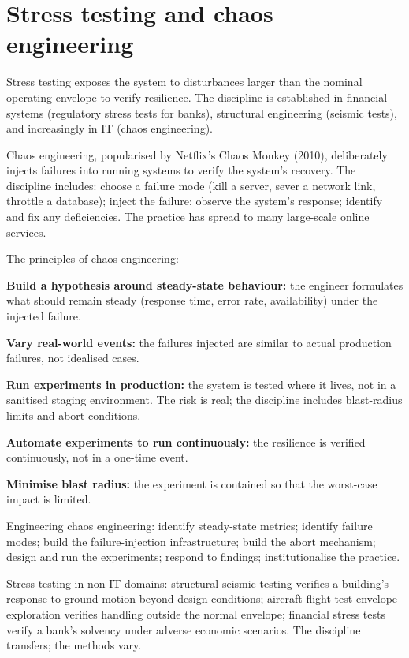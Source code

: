 \section{Stress testing and chaos engineering}

Stress testing exposes the system to disturbances larger than the nominal operating envelope to verify resilience. The discipline is established in financial systems (regulatory stress tests for banks), structural engineering (seismic tests), and increasingly in IT (chaos engineering).

Chaos engineering, popularised by Netflix's Chaos Monkey (2010), deliberately injects failures into running systems to verify the system's recovery. The discipline includes: choose a failure mode (kill a server, sever a network link, throttle a database); inject the failure; observe the system's response; identify and fix any deficiencies. The practice has spread to many large-scale online services.

The principles of chaos engineering:

\textbf{Build a hypothesis around steady-state behaviour:} the engineer formulates what should remain steady (response time, error rate, availability) under the injected failure.

\textbf{Vary real-world events:} the failures injected are similar to actual production failures, not idealised cases.

\textbf{Run experiments in production:} the system is tested where it lives, not in a sanitised staging environment. The risk is real; the discipline includes blast-radius limits and abort conditions.

\textbf{Automate experiments to run continuously:} the resilience is verified continuously, not in a one-time event.

\textbf{Minimise blast radius:} the experiment is contained so that the worst-case impact is limited.

Engineering chaos engineering: identify steady-state metrics; identify failure modes; build the failure-injection infrastructure; build the abort mechanism; design and run the experiments; respond to findings; institutionalise the practice.

Stress testing in non-IT domains: structural seismic testing verifies a building's response to ground motion beyond design conditions; aircraft flight-test envelope exploration verifies handling outside the normal envelope; financial stress tests verify a bank's solvency under adverse economic scenarios. The discipline transfers; the methods vary.

